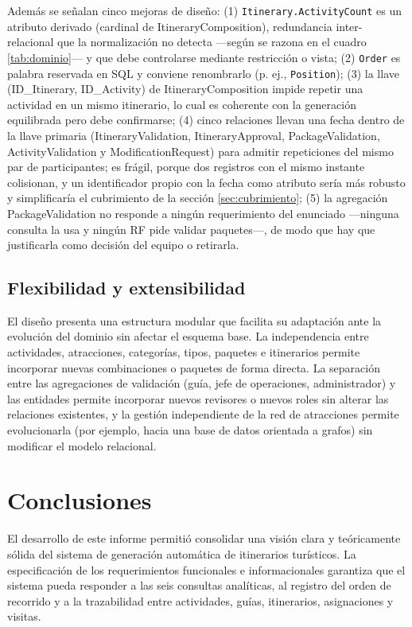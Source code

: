 \documentclass[11pt,a4paper]{article}
\begin{document}
Además se señalan cinco mejoras de diseño: (1) \texttt{Itinerary.ActivityCount} es un atributo derivado (cardinal de ItineraryComposition), redundancia inter-relacional que la normalización no detecta —según se razona en el cuadro \ref{tab:dominio}— y que debe controlarse mediante restricción o vista; (2) \texttt{Order} es palabra reservada en SQL y conviene renombrarlo (p. ej., \texttt{Position}); (3) la llave (ID\_Itinerary, ID\_Activity) de ItineraryComposition impide repetir una actividad en un mismo itinerario, lo cual es coherente con la generación equilibrada pero debe confirmarse; (4) cinco relaciones llevan una fecha dentro de la llave primaria (ItineraryValidation, ItineraryApproval, PackageValidation, ActivityValidation y ModificationRequest) para admitir repeticiones del mismo par de participantes; es frágil, porque dos registros con el mismo instante colisionan, y un identificador propio con la fecha como atributo sería más robusto y simplificaría el cubrimiento de la sección \ref{sec:cubrimiento}; (5) la agregación PackageValidation no responde a ningún requerimiento del enunciado —ninguna consulta la usa y ningún RF pide validar paquetes—, de modo que hay que justificarla como decisión del equipo o retirarla.

\subsection{Flexibilidad y extensibilidad}
El diseño presenta una estructura modular que facilita su adaptación ante la evolución del dominio sin afectar el esquema base. La independencia entre actividades, atracciones, categorías, tipos, paquetes e itinerarios permite incorporar nuevas combinaciones o paquetes de forma directa. La separación entre las agregaciones de validación (guía, jefe de operaciones, administrador) y las entidades permite incorporar nuevos revisores o nuevos roles sin alterar las relaciones existentes, y la gestión independiente de la red de atracciones permite evolucionarla (por ejemplo, hacia una base de datos orientada a grafos) sin modificar el modelo relacional.

\section{Conclusiones}
El desarrollo de este informe permitió consolidar una visión clara y teóricamente sólida del sistema de generación automática de itinerarios turísticos. La especificación de los requerimientos funcionales e informacionales garantiza que el sistema pueda responder a las seis consultas analíticas, al registro del orden de recorrido y a la trazabilidad entre actividades, guías, itinerarios, asignaciones y visitas.
\end{document}
